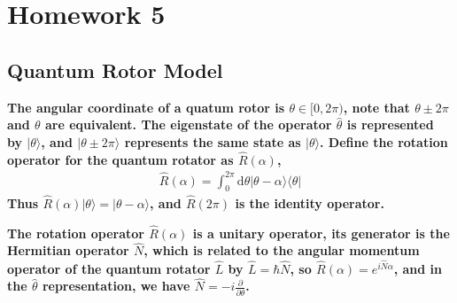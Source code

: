 \documentclass[../../main.tex]{subfiles}
\begin{document}
\section{Homework 5}
\subsection{Quantum Rotor Model}
\textbf{The angular coordinate of a quatum rotor is $\theta\in [0,2\pi)$, note that $\theta \pm 2\pi$ and $\theta$ are equivalent. The eigenstate of the operator $\hat{\theta}$ is represented by $|\theta\rangle$, and $|\theta\pm 2\pi\rangle$ represents the same state as $|\theta\rangle$. Define the rotation operator for the quantum rotator as $\hat{R}(\alpha)$,
\begin{align*}
  \hat{R}(\alpha) = \int_{0}^{2\pi}\mathrm{d}\theta|\theta - \alpha\rangle\langle\theta|
\end{align*}
Thus $\hat{R}(\alpha)|\theta\rangle = |\theta-\alpha\rangle$, and $\hat{R}(2\pi)$ is the identity operator.}

\textbf{The rotation operator $\hat{R}(\alpha)$ is a unitary operator, its generator is the Hermitian operator $\hat{N}$, which is related to the angular momentum operator of the quantum rotator $\hat{L}$ by $\hat{L} = \hbar\hat{N}$, so $\hat{R}(\alpha) = e^{i\hat{N}\alpha}$, and in the $\hat{\theta}$ representation, we have $\hat{N} = -i\frac{\partial}{\partial\theta}$.}
\end{document}
